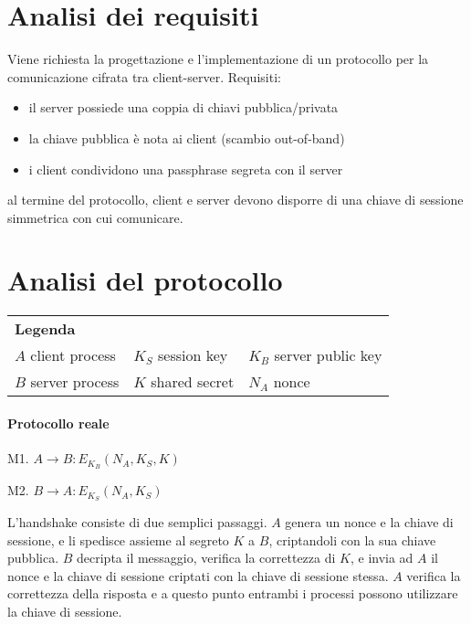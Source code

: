 \documentclass[a4paper]{article}
\title{\Title}
\author{\Author}
\date{\today}
\begin{document}
\maketitle

\section{Analisi dei requisiti}
Viene richiesta la progettazione e l'implementazione di un protocollo per la comunicazione cifrata tra client-server. Requisiti:
\begin{itemize}
\item il server possiede una coppia di chiavi pubblica/privata
\item la chiave pubblica è nota ai client (scambio out-of-band)
\item i client condividono una passphrase segreta con il server
\end{itemize}
al termine del protocollo, client e server devono disporre di una chiave di sessione simmetrica con cui comunicare.


\section{Analisi del protocollo}

\begin{tabular}{ p{4cm} p{4cm} p{4cm} }
  {\bf Legenda}\\
  $A$     client process &
  $K_S$   session key &
  $K_{B}$ server public key \\

  $B$ server process &
  $K$ shared secret &
  $N_A$ nonce 
\end{tabular}


\paragraph{Protocollo reale}
\begin{list}{}{}
\item M1. $ A \rightarrow B: E_{K_{B}}(N_A, K_S, K) $
\item M2. $ B \rightarrow A: E_{K_S}(N_A, K_S) $
\end{list}
L'handshake consiste di due semplici passaggi. $A$ genera un nonce e la chiave di sessione, e li spedisce assieme al segreto $K$ a $B$, criptandoli con la sua chiave pubblica. $B$ decripta il messaggio, verifica la correttezza di $K$, e invia ad $A$ il nonce e la chiave di sessione criptati con la chiave di sessione stessa. $A$ verifica la correttezza della risposta e a questo punto entrambi i processi possono utilizzare la chiave di sessione.
\end{document}
